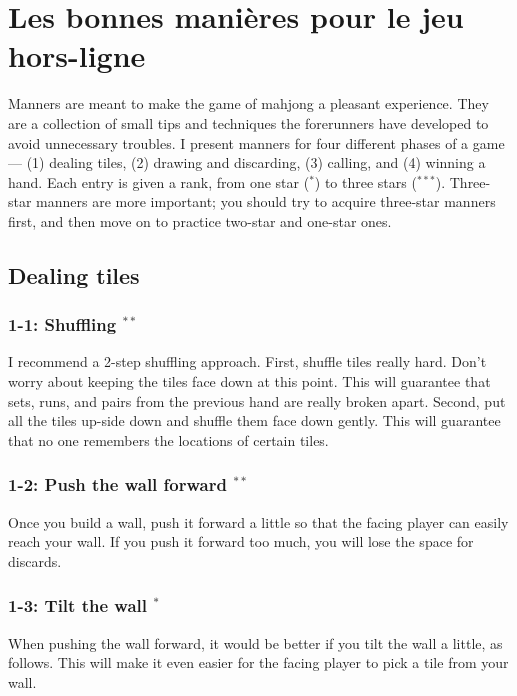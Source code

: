 
\chapter{Les bonnes manières pour le jeu hors-ligne} \label{ch:manners}
\thispagestyle{empty}

Manners are meant to make the game of mahjong a pleasant experience. 
They are a collection of small tips and techniques the forerunners have developed to avoid unnecessary troubles. 
I present manners for four different phases of a game --- (1) dealing tiles, (2) drawing and discarding, (3) calling, and (4) winning a hand. 
Each entry is given a rank, from one star ($^*$) to three stars ($^{***}$). Three-star manners are more important; you should try to acquire three-star manners first, and then move on to practice two-star and one-star ones. 

\section{Dealing tiles}

\subsection*{1-1: Shuffling $^{**}$}
I recommend a 2-step shuffling approach. First, shuffle tiles really hard. Don't worry about keeping the tiles face down at this point. This will guarantee that sets, runs, and pairs from the previous hand are really broken apart. Second, put all the tiles up-side down and shuffle them face down gently. This will guarantee that no one remembers the locations of certain tiles. 

\subsection*{1-2: Push the wall forward $^{**}$}
Once you build a wall, push it forward a little so that the facing player can easily reach your wall. If you push it forward too much, you will lose the space for discards. 


\subsection*{1-3: Tilt the wall $^{*}$}
When pushing the wall forward, it would be better if you tilt the wall a little, as follows. This will make it even easier for the facing player to pick a tile from your wall.
\bp
{}
\ep

